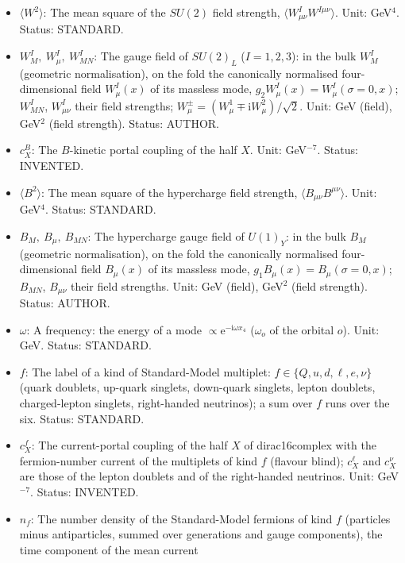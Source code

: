 \documentclass[
  10pt,
]{article}
\begin{document}
\begin{itemize}
\item
  \(\langle W^2\rangle\): The mean square of the \(SU(2)\) field
  strength, \(\langle W^I_{\mu\nu}W^{I\mu\nu}\rangle\). Unit: GeV\(^4\).
  Status: STANDARD.
\item
  \(W^I_M,\ W^I_\mu,\ W^I_{MN}\): The gauge field of \(SU(2)_L\)
  (\(I = 1, 2, 3\)): in the bulk \(W^I_M\) (geometric normalisation), on
  the fold the canonically normalised four-dimensional field
  \(W^I_\mu(x)\) of its massless mode,
  \(g_2W^I_\mu(x) = W^I_\mu(\sigma = 0, x)\); \(W^I_{MN}\),
  \(W^I_{\mu\nu}\) their field strengths;
  \(W^\pm_\mu = (W^1_\mu \mp \mathrm{i}W^2_\mu)/\sqrt2\). Unit: GeV
  (field), GeV\(^2\) (field strength). Status: AUTHOR.
\item
  \(c^{B}_X\): The \(B\)-kinetic portal coupling of the half \(X\).
  Unit: GeV\(^{-7}\). Status: INVENTED.
\item
  \(\langle B^2\rangle\): The mean square of the hypercharge field
  strength, \(\langle B_{\mu\nu}B^{\mu\nu}\rangle\). Unit: GeV\(^4\).
  Status: STANDARD.
\item
  \(B_M,\ B_\mu,\ B_{MN}\): The hypercharge gauge field of \(U(1)_Y\):
  in the bulk \(B_M\) (geometric normalisation), on the fold the
  canonically normalised four-dimensional field \(B_\mu(x)\) of its
  massless mode, \(g_1B_\mu(x) = B_\mu(\sigma = 0, x)\); \(B_{MN}\),
  \(B_{\mu\nu}\) their field strengths. Unit: GeV (field), GeV\(^2\)
  (field strength). Status: AUTHOR.
\item
  \(\omega\): A frequency: the energy of a mode
  \(\propto \mathrm{e}^{-\mathrm{i}\omega x_4}\) (\(\omega_o\) of the
  orbital \(o\)). Unit: GeV. Status: STANDARD.
\item
  \(f\): The label of a kind of Standard-Model multiplet:
  \(f \in \{Q, u, d, \ell, e, \nu\}\) (quark doublets, up-quark
  singlets, down-quark singlets, lepton doublets, charged-lepton
  singlets, right-handed neutrinos); a sum over \(f\) runs over the six.
  Status: STANDARD.
\item
  \(c^{f}_X\): The current-portal coupling of the half \(X\) of
  dirac16complex with the fermion-number current of the multiplets of
  kind \(f\) (flavour blind); \(c^{\ell}_X\) and \(c^{\nu}_X\) are those
  of the lepton doublets and of the right-handed neutrinos. Unit:
  GeV\(^{-7}\). Status: INVENTED.
\item
  \(n_f\): The number density of the Standard-Model fermions of kind
  \(f\) (particles minus antiparticles, summed over generations and
  gauge components), the time component of the mean current

\end{itemize}
\end{document}
